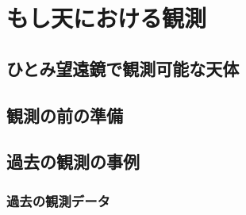 \chapter{もし天における観測} %
\label{chap:moshiten}

\section{ひとみ望遠鏡で観測可能な天体}

\section{観測の前の準備}

\section{過去の観測の事例}

\subsection{過去の観測データ}